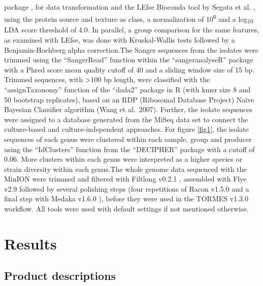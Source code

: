 \documentclass[preprint, 3p,
authoryear]{elsarticle} %
\begin{document}
package \citep{Stagaman.2022}, for data transformation and the LEfse
Bioconda tool by Segata et al. \citep{Segata.2011}, using the protein
source and texture as class, a normalization of 10\textsuperscript{6}
and a log\textsubscript{10} LDA score threshold of 4.0. In parallel, a
group comparison for the same features, as examined with LEfse, was done
with Kruskal-Wallis tests followed by a Benjamin-Hochberg alpha
correction.\newline  The Sanger sequences from the isolates were trimmed
using the ``SangerRead'' function within the ``sangeranalyseR'' package
\citep{Chao.2020} with a Phred score mean quality cutoff of 40 and a
sliding window size of 15 bp. Trimmed sequences, with \textgreater100 bp
length, were classified with the ``assignTaxonomy'' function of the
``dada2'' package \citep{Callahan.2016} in R (with kmer size 8 and 50
bootstrap replicates), based on an RDP (Ribosomal Database Project)
Naïve Bayesian Classifier algorithm (Wang et al.~2007). Further, the
isolate sequences were assigned to a database generated from the MiSeq
data set to connect the culture-based and culture-independent
approaches. For figure \ref{fig1}, the isolate sequences of each genus
were clustered within each sample, group and producer using the
``IdClusters'' function from the ``DECIPHER'' package
\citep{Wright.2016} with a cutoff of 0.06. More clusters within each
genus were interpreted as a higher species or strain diversity within
each genus.\newline The whole genome data sequenced with the MinION were
trimmed and filtered with Filtlong v0.2.1 \citep{Wick.2021}, assembled
with Flye v2.9 \citep{Kolmogorov.2019, Lin.2016} followed by several
polishing steps (four repetitions of Racon v1.5.0 \citep{Vaser.2017} and
a final step with Medaka v1.6.0 \citep{OxfordNanoporeTechnologies.2022}
), before they were used in the TORMES v1.3.0 \citep{Quijada.2019}
workflow. All tools were used with default settings if not mentioned
otherwise.

\hypertarget{results}{%
\section{Results}\label{results}}

\hypertarget{product-descriptions}{%
\subsection{Product descriptions}\label{product-descriptions}}
\end{document}
